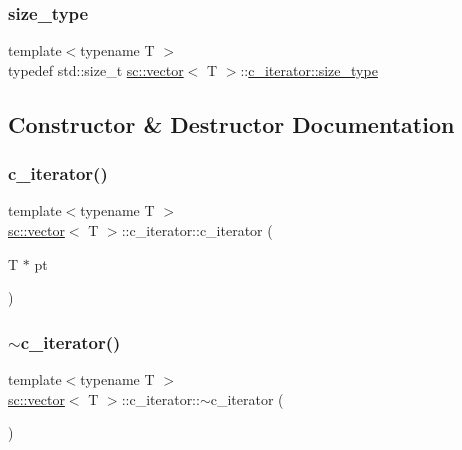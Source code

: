\subsubsection{\texorpdfstring{size\+\_\+type}{size\_type}}
{\footnotesize\ttfamily template$<$typename T $>$ \\
typedef std\+::size\+\_\+t \hyperlink{classsc_1_1vector}{sc\+::vector}$<$ T $>$\+::\hyperlink{classsc_1_1vector_1_1c__iterator_a0782c02315d2d1a91a491f8e5347c228}{c\+\_\+iterator\+::size\+\_\+type}}



\subsection{Constructor \& Destructor Documentation}
\mbox{\label{classsc_1_1vector_1_1c__iterator_a54eede6a5a05f6c0f5f9ff2f2839626f}} 
\subsubsection{\texorpdfstring{c\+\_\+iterator()}{c\_iterator()}}
{\footnotesize\ttfamily template$<$typename T $>$ \\
\hyperlink{classsc_1_1vector}{sc\+::vector}$<$ T $>$\+::c\+\_\+iterator\+::c\+\_\+iterator (\begin{DoxyParamCaption}\item[{T $\ast$}]{pt }\end{DoxyParamCaption})\hspace{0.3cm}{\ttfamily [inline]}}

\mbox{\label{classsc_1_1vector_1_1c__iterator_ab38a9e7b5bd73dceaabe12824e15c9d3}} 
\subsubsection{\texorpdfstring{$\sim$c\+\_\+iterator()}{~c\_iterator()}}
{\footnotesize\ttfamily template$<$typename T $>$ \\
\hyperlink{classsc_1_1vector}{sc\+::vector}$<$ T $>$\+::c\+\_\+iterator\+::$\sim$c\+\_\+iterator (\begin{DoxyParamCaption}{ }\end{DoxyParamCaption})\hspace{0.3cm}{\ttfamily [inline]}}



